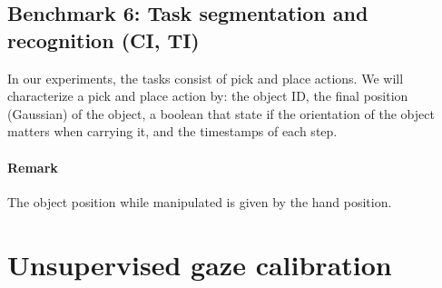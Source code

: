 \documentclass[11pt,a4paper]{article}
\begin{document}
\subsection{Benchmark 6: Task segmentation and recognition (CI, TI)}
In our experiments, the tasks consist of pick and place actions. We will characterize a pick and place action by: the object ID, the final position (Gaussian) of the object, a boolean that state if the orientation of the object matters when carrying it, and the timestamps of each step.
\paragraph{Remark} The object position while manipulated is given by the hand position.

\section{Unsupervised gaze calibration}
\end{document}
